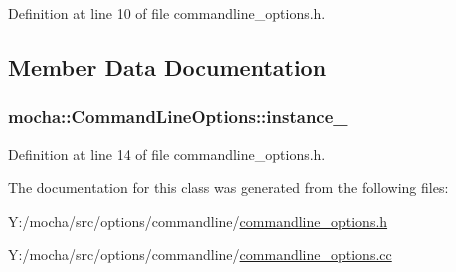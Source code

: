Definition at line 10 of file commandline\_\-options.h.



\subsection{Member Data Documentation}
\hypertarget{classmocha_1_1_command_line_options_a63d8a2ce777efc872a21d5e13c4a93e1}{
\subsubsection[{instance\_\-}]{ {\bf mocha::CommandLineOptions::instance\_\-}}}
\label{classmocha_1_1_command_line_options_a63d8a2ce777efc872a21d5e13c4a93e1}


Definition at line 14 of file commandline\_\-options.h.



The documentation for this class was generated from the following files:\begin{DoxyCompactItemize}
\item 
Y:/mocha/src/options/commandline/\hyperlink{commandline__options_8h}{commandline\_\-options.h}\item 
Y:/mocha/src/options/commandline/\hyperlink{commandline__options_8cc}{commandline\_\-options.cc}\end{DoxyCompactItemize}
